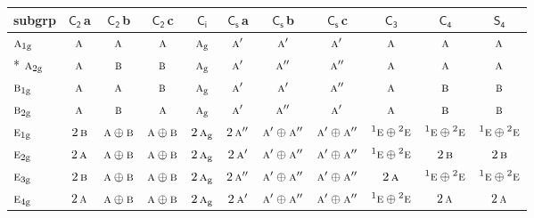 \documentclass[10pt,a4paper]{article}
\numberwithin{equation}{section}
\newcommand{\grp}[1]{\mathsf{#1}}
\newcommand{\irr}[1]{\text{\normalfont\scshape #1}}
\newcommand{\conjpair}[1]{{}^{#1}}
\newcommand{\ptag}[1]{\mathrm{#1}}
\newcommand{\clsletter}[1]{\,{\scriptsize\color{black!55}#1}}
\begin{document}
{\small\begin{longtable}{@{}lcccccccccc@{}}\toprule
subgrp & \href{C2.pdf}{$\grp{C_{2}}$}\clsletter{a} & \href{C2.pdf}{$\grp{C_{2}}$}\clsletter{b} & \href{C2.pdf}{$\grp{C_{2}}$}\clsletter{c} & \href{S2.pdf}{$\grp{C_{i}}$} & \href{C1v.pdf}{$\grp{C_{s}}$}\clsletter{a} & \href{C1v.pdf}{$\grp{C_{s}}$}\clsletter{b} & \href{C1v.pdf}{$\grp{C_{s}}$}\clsletter{c} & \href{C3.pdf}{$\grp{C_{3}}$} & \href{C4.pdf}{$\grp{C_{4}}$} & \href{S4.pdf}{$\grp{S_{4}}$}\\\midrule\endhead
\bottomrule\endfoot\endlastfoot
$\irr{a}_{1\ptag{g}}$ & $\irr{a}$ & $\irr{a}$ & $\irr{a}$ & $\irr{a}_{\ptag{g}}$ & $\irr{a}'$ & $\irr{a}'$ & $\irr{a}'$ & $\irr{a}$ & $\irr{a}$ & $\irr{a}$\\*
$\irr{a}_{2\ptag{g}}$ & $\irr{a}$ & $\irr{b}$ & $\irr{b}$ & $\irr{a}_{\ptag{g}}$ & $\irr{a}'$ & $\irr{a}''$ & $\irr{a}''$ & $\irr{a}$ & $\irr{a}$ & $\irr{a}$\\
$\irr{b}_{1\ptag{g}}$ & $\irr{a}$ & $\irr{a}$ & $\irr{b}$ & $\irr{a}_{\ptag{g}}$ & $\irr{a}'$ & $\irr{a}'$ & $\irr{a}''$ & $\irr{a}$ & $\irr{b}$ & $\irr{b}$\\
$\irr{b}_{2\ptag{g}}$ & $\irr{a}$ & $\irr{b}$ & $\irr{a}$ & $\irr{a}_{\ptag{g}}$ & $\irr{a}'$ & $\irr{a}''$ & $\irr{a}'$ & $\irr{a}$ & $\irr{b}$ & $\irr{b}$\\
$\irr{e}_{1\ptag{g}}$ & $2\,\irr{b}$ & $\irr{a}\oplus \irr{b}$ & $\irr{a}\oplus \irr{b}$ & $2\,\irr{a}_{\ptag{g}}$ & $2\,\irr{a}''$ & $\irr{a}'\oplus \irr{a}''$ & $\irr{a}'\oplus \irr{a}''$ & $\conjpair{1}\irr{e}\oplus \conjpair{2}\irr{e}$ & $\conjpair{1}\irr{e}\oplus \conjpair{2}\irr{e}$ & $\conjpair{1}\irr{e}\oplus \conjpair{2}\irr{e}$\\
$\irr{e}_{2\ptag{g}}$ & $2\,\irr{a}$ & $\irr{a}\oplus \irr{b}$ & $\irr{a}\oplus \irr{b}$ & $2\,\irr{a}_{\ptag{g}}$ & $2\,\irr{a}'$ & $\irr{a}'\oplus \irr{a}''$ & $\irr{a}'\oplus \irr{a}''$ & $\conjpair{1}\irr{e}\oplus \conjpair{2}\irr{e}$ & $2\,\irr{b}$ & $2\,\irr{b}$\\
$\irr{e}_{3\ptag{g}}$ & $2\,\irr{b}$ & $\irr{a}\oplus \irr{b}$ & $\irr{a}\oplus \irr{b}$ & $2\,\irr{a}_{\ptag{g}}$ & $2\,\irr{a}''$ & $\irr{a}'\oplus \irr{a}''$ & $\irr{a}'\oplus \irr{a}''$ & $2\,\irr{a}$ & $\conjpair{1}\irr{e}\oplus \conjpair{2}\irr{e}$ & $\conjpair{1}\irr{e}\oplus \conjpair{2}\irr{e}$\\
$\irr{e}_{4\ptag{g}}$ & $2\,\irr{a}$ & $\irr{a}\oplus \irr{b}$ & $\irr{a}\oplus \irr{b}$ & $2\,\irr{a}_{\ptag{g}}$ & $2\,\irr{a}'$ & $\irr{a}'\oplus \irr{a}''$ & $\irr{a}'\oplus \irr{a}''$ & $\conjpair{1}\irr{e}\oplus \conjpair{2}\irr{e}$ & $2\,\irr{a}$ & $2\,\irr{a}$\\

\end{longtable}}
\end{document}
